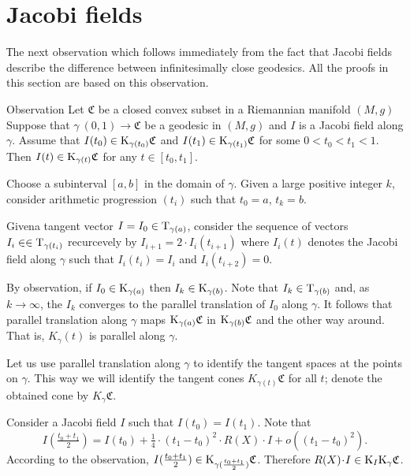 \documentclass[a4paper,10pt]{article}
\begin{document}
\qeds

\section{Jacobi fields}

Тhe next observation which follows immediately from the fact that Jacobi fields describe the difference between infinitesimally close geodesics.
All the proofs in this section are based on this observation.


\begin{thm}{Observation}
Let  $\mathfrak{C}$ be a closed convex subset in a Riemannian manifold $(M,g)$
Suppose that $\gamma\:(0,1)\to\mathfrak{C}$ be a geodesic in $(M,g)$ and $I$ is a Jacobi field along $\gamma$.
Assume that $I(t_0)\in \mathrm{K}_{\gamma(t_0)}\mathfrak{C}$ and $I(t_1)\in \mathrm{K}_{\gamma(t_1)}\mathfrak{C}$ for some $0<t_0<t_1<1$.
Then $I(t)\in \mathrm{K}_{\gamma(t)}\mathfrak{C}$ for any $t\in [t_0,t_1]$.
\end{thm}


Choose a subinterval $[a,b]$ in the domain of $\gamma$.
Given a large positive integer $k$, consider arithmetic progression
$(t_i)$ such that $t_0=a$, $t_k=b$.

Givena tangent vector $I=I_0\in\mathrm{T}_{\gamma(a)}$, consider the sequence of vectors $I_i\in\in\mathrm{T}_{\gamma(t_i)}$ recurcevely by $I_{i+1}=2\cdot I_i(t_{i+1})$ where $I_i(t)$ denotes the Jacobi field along $\gamma$ such that $I_i(t_i)=I_i$ and $I_i(t_{i+2})=0$.

By observation, if $I_0\in \mathrm{K}_{\gamma(a)}$ then $I_k\in \mathrm{K}_{\gamma(b)}$.
Note that $I_k\in\mathrm{T}_{\gamma(b)}$ and, as $k\to \infty$, the $I_k$ converges to the parallel translation of $I_0$ along $\gamma$.
It follows that parallel translation along $\gamma$ maps $\mathrm{K}_{\gamma(a)}\mathfrak{C}$ in $\mathrm{K}_{\gamma(b)}\mathfrak{C}$ and the other way around.
That is, $K_\gamma(t)$ is parallel along $\gamma$.

Let us use parallel translation along $\gamma$ to identify the tangent spaces at the points on $\gamma$.
This way we will identify the tangent cones $K_{\gamma(t)}\mathfrak{C}$ for all $t$;
denote the obtained cone by $K_\gamma\mathfrak{C}$.

Consider a Jacobi field $I$ such that $I(t_0)=I(t_1)$.
Note that 
\[I(\tfrac{t_0+t_1}2)=I(t_0)+\tfrac14\cdot(t_1-t_0)^2\cdot R(X)\cdot I+o((t_1-t_0)^2).\]
According to the observation, $I(\tfrac{t_0+t_1}2)\in \mathrm{K}_{\gamma(\frac{t_0+t_1}2)} \mathfrak{C}$.
Therefore $R(X)\cdot I\in \K_I\K_\gamma\mathfrak{C}$.
\qeds




\end{document}
